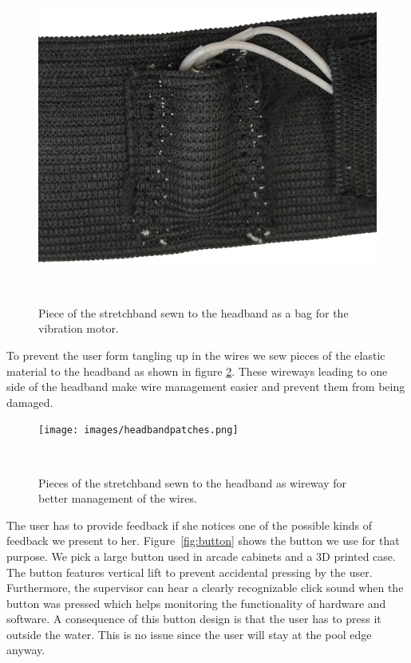\begin{figure}
	\includegraphics[width= \textwidth]{images/headbandmotorbag.png}
	\caption{Piece of the stretchband sewn to the headband as a bag for the vibration motor.}~\label{fig:headbandmotorbag}
\end{figure}

To prevent the user form tangling up in the wires we sew pieces of the elastic material to the headband as shown in figure \ref{fig:headbandpatches}.
These wireways leading to one side of the headband make wire management easier and prevent them from being damaged.

\begin{figure}
	\texttt{[image: images/headbandpatches.png]}
	\caption{Pieces of the stretchband sewn to the headband as wireway for better management of the wires.}~\label{fig:headbandpatches}
\end{figure}

The user has to provide feedback if she notices one of the possible kinds of feedback we present to her.
Figure~\ref{fig:button} shows the button we use for that purpose.
We pick a large button used in arcade cabinets and a 3D printed case. 
The button features vertical lift to prevent accidental pressing by the user. 
Furthermore, the supervisor can hear a clearly recognizable click sound when the button was pressed which helps monitoring the functionality of hardware and software.
A consequence of this button design is that the user has to press it outside the water.
This is no issue since the user will stay at the pool edge anyway.

